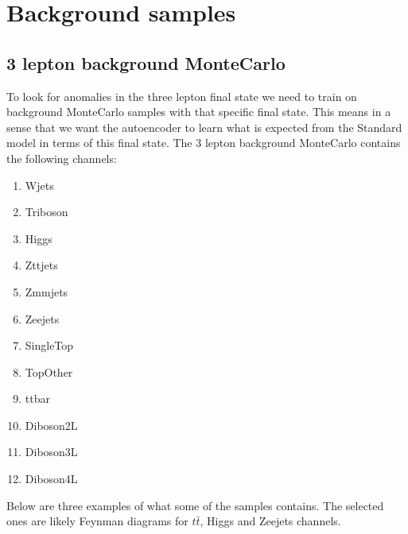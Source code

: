\section{Background samples}

\subsection*{3 lepton background MonteCarlo}
To look for anomalies in the three lepton final state we need to train on background MonteCarlo samples with that specific final state. 
This means in a sense that we want the autoencoder to learn what is expected from the Standard model in terms of this final state. 
The 3 lepton background MonteCarlo contains the following channels:

\begin{enumerate}
    \item Wjets
    \item Triboson
    \item Higgs
    \item Zttjets
    \item Zmmjets
    \item Zeejets
    \item SingleTop
    \item TopOther
    \item ttbar
    \item Diboson2L
    \item Diboson3L
    \item Diboson4L
\end{enumerate}

Below are three examples of what some of the samples contains. The selected ones are likely Feynman diagrams for $t\bar{t}$, Higgs and Zeejets channels. 

